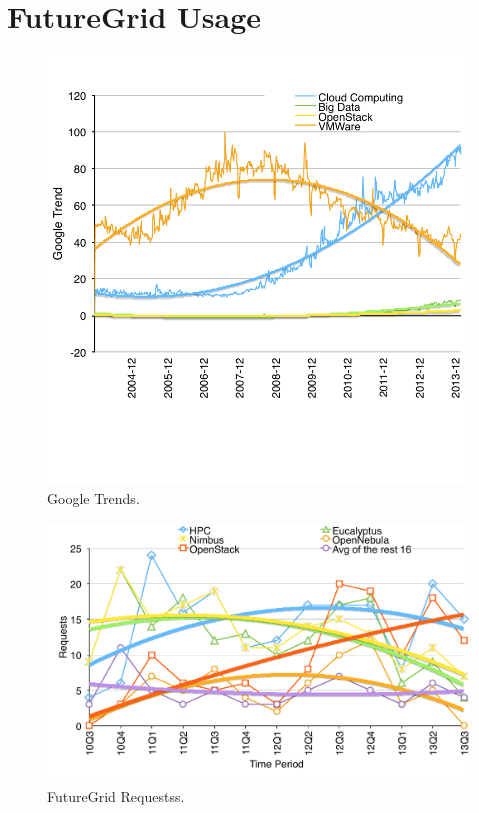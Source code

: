 
\section{FutureGrid Usage}

\begin{figure}[htb]
  \centering
    \includegraphics[width=1.0\textwidth]{images/google-trend.pdf}
  \caption{Google Trends.}
\end{figure}

\begin{figure}[htb]
  \centering
    \includegraphics[width=1.0\textwidth]{images/trend-a.pdf}
  \caption{FutureGrid Requestss.}
\end{figure}

